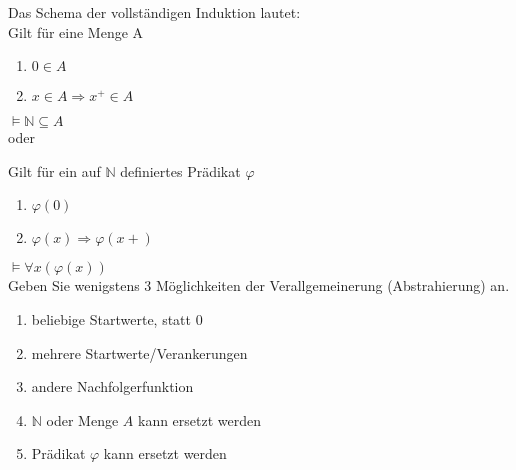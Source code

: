 \begin{card}
	Das Schema der vollständigen Induktion lautet:\\
	Gilt für eine Menge A
	\begin{enumerate}
	\item $0 \in A$
	\item $x \in A \Rightarrow x^+ \in A$
	\end{enumerate}
	$\vDash \mathbb{N} \subseteq A$\\
	
	oder 
	
	Gilt für ein auf $\mathbb{N}$ definiertes Prädikat $\varphi$	
	\begin{enumerate}
	\item $\varphi(0)$
	\item $\varphi(x) \Rightarrow \varphi(x+)$
	\end{enumerate}
	$\vDash \forall x (\varphi(x))$\\
	Geben Sie wenigstens 3 Möglichkeiten der Verallgemeinerung (Abstrahierung) an.
	\hr
	\begin{enumerate}
	\item beliebige Startwerte, statt 0
	\item mehrere Startwerte/Verankerungen
	\item andere Nachfolgerfunktion
	\item $\mathbb{N}$ oder Menge $A$ kann ersetzt werden
	\item Prädikat $\varphi$ kann ersetzt werden
	\end{enumerate}
\end{card}